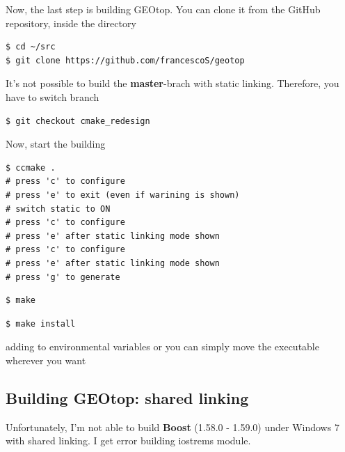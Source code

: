 Now, the last step is building GEOtop. You can clone it from the GitHub repository, inside the  directory

\begin{lstlisting}[style=bashStyle]
$ cd ~/src
$ git clone https://github.com/francescoS/geotop
\end{lstlisting}

It's not possible to build the \textbf{master}-brach with static linking. Therefore, you have to switch branch

\begin{lstlisting}[style=bashStyle]
$ git checkout cmake_redesign
\end{lstlisting} %

Now, start the building

\begin{lstlisting}[style=bashStyle]
$ ccmake .
# press 'c' to configure
# press 'e' to exit (even if warining is shown)
# switch static to ON
# press 'c' to configure
# press 'e' after static linking mode shown
# press 'c' to configure
# press 'e' after static linking mode shown
# press 'g' to generate
\end{lstlisting} %

\begin{lstlisting}[style=bashStyle]
$ make
\end{lstlisting} %

\begin{lstlisting}[style=bashStyle]
$ make install
\end{lstlisting} %

adding  to environmental variables or you can simply move the executable wherever you want

\subsection{Building GEOtop: shared linking}

Unfortunately, I'm not able to build \textbf{Boost} (1.58.0 - 1.59.0) under Windows 7 with shared linking. I get error building iostrems module.